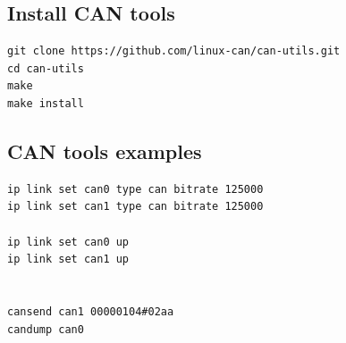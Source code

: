 \subsection{Install CAN tools}
\begin{lstlisting}
git clone https://github.com/linux-can/can-utils.git
cd can-utils
make
make install
\end{lstlisting}

\subsection{CAN tools examples}
\begin{lstlisting}
ip link set can0 type can bitrate 125000
ip link set can1 type can bitrate 125000

ip link set can0 up
ip link set can1 up


cansend can1 00000104#02aa
candump can0
\end{lstlisting}
